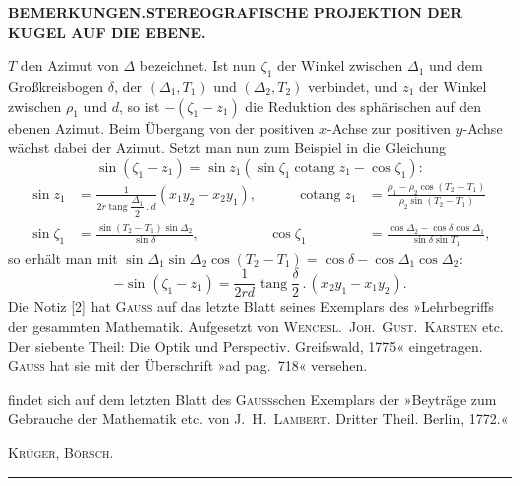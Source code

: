\begingroup
\setlength{\abovedisplayskip}{7pt}
\setlength{\belowdisplayskip}{7pt}
\setlength{\abovedisplayshortskip}{3pt}
\setlength{\belowdisplayshortskip}{4pt}

\par\clearpage
\noindent{}\hfill{\fontsize{8}{10}\selectfont\textbf{BEMERKUNGEN.\quad STEREOGRAFISCHE PROJEKTION DER KUGEL AUF DIE EBENE.}}\hfill\null\par\medskip

{\small
\noindent \(T\) den Azimut von \(\Delta\) bezeichnet. Ist nun \(\zeta_1\) der Winkel zwischen
\(\Delta_1\) und dem Großkreisbogen \(\delta\), der \((\Delta_1,T_1)\) und
\((\Delta_2,T_2)\) verbindet, und \(z_1\) der Winkel zwischen \(\rho_1\) und \(d\),
so ist \(-(\zeta_1-z_1)\) die Reduktion des sphärischen auf den ebenen Azimut.
Beim Übergang von der positiven \(x\)-Achse zur positiven \(y\)-Achse wächst dabei
der Azimut. Setzt man nun zum Beispiel in die Gleichung
\[
\sin(\zeta_1-z_1)=\sin z_1(\sin\zeta_1\operatorname{cotang}z_1-\cos\zeta_1):
\]
\[
\begin{alignedat}{2}
\sin z_1&=\frac1{2r\operatorname{tang}\dfrac{\Delta_1}2\,.\,d}(x_1y_2-x_2y_1),
&\qquad\operatorname{cotang}z_1&=\frac{\rho_1-\rho_2\cos(T_2-T_1)}{\rho_2\sin(T_2-T_1)}\\
\sin\zeta_1&=\frac{\sin(T_2-T_1)\sin\Delta_2}{\sin\delta},
&\cos\zeta_1&=\frac{\cos\Delta_2-\cos\delta\cos\Delta_1}{\sin\delta\sin T_1},
\end{alignedat}
\]
\noindent so erhält man mit
\(\sin\Delta_1\sin\Delta_2\cos(T_2-T_1)=\cos\delta-\cos\Delta_1\cos\Delta_2\):
\[
-\sin(\zeta_1-z_1)=\frac1{2rd}\operatorname{tang}\frac{\delta}2\,.\,(x_2y_1-x_1y_2).
\]
Die Notiz [2] hat \textsc{Gauss} auf das letzte Blatt seines Exemplars des
»Lehrbegriffs der gesammten Mathematik. Aufgesetzt von \textsc{Wencesl.\ Joh.\ Gust.\
Karsten} etc. Der siebente Theil: Die Optik und Perspectiv. Greifswald, 1775«
eingetragen. \textsc{Gauss} hat sie mit der Überschrift »ad pag.\ 718« versehen.
\par\noindent [3] findet sich auf dem letzten Blatt des \textsc{Gauss}schen Exemplars
der »Beyträge zum Gebrauche der Mathematik etc. von \textsc{J.\ H.\ Lambert.}
Dritter Theil. Berlin, 1772.«
\par
\noindent\hfill\textsc{Krüger, Börsch.}\hspace*{.06\linewidth}\par}
\vspace{2\baselineskip}
\begin{center}\rule{.24\linewidth}{.4pt}\end{center}

